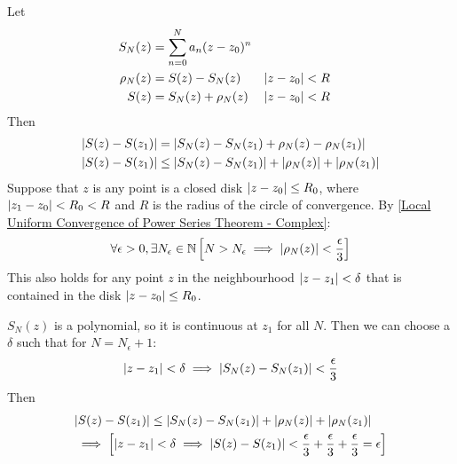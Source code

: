 \documentclass[12pt, english]{book}
\makeatletter
\renewenvironment{proof}[1][\proofname]{\par
	\pushQED{\qed}%
	\normalfont \topsep6\p@\@plus6\p@\relax
	\list{}{%
		\settowidth{\leftmargin}{\itshape\proofname:\hskip\labelsep}%
		\setlength{\labelwidth}{0pt}%
		\setlength{\itemindent}{-\leftmargin}%
	}%
	\item[\hskip\labelsep\itshape#1\@addpunct{:}]\ignorespaces
	}{ \popQED\endlist\@endpefalse}
\makeatother
\begin{document}
	\begin{proof}
		Let 
		\begin{align*}
			S_N(z) &= \sum_{n=0}^{N} a_n(z-z_0)^n \\
			\rho_N(z) &= S(z) - S_N(z) & \abs{z-z_0} &< R \\
			S(z) &= S_N(z) + \rho_N(z) & \abs{z-z_0} &< R
		\end{align*}
		Then 
		\begin{align*}
			\abs{S(z) - S(z_1)} &= \abs{S_N(z) - S_N(z_1) + \rho_N(z) - \rho_N(z_1)} \\
			\abs{S(z) - S(z_1)} &\leq \abs{S_N(z) - S_N(z_1)}+ \abs{\rho_N(z)} + \abs{\rho_N(z_1)}
		\end{align*}
		Suppose that \(z\) is any point is a closed disk \(\abs{z-z_0}\leq R_0\), where \(\abs{z_1 - z_0} < R_0 < R\) and \(R\) is the radius of the circle of convergence. By \cref{Local Uniform Convergence of Power Series Theorem - Complex}:
		\begin{align*}
			\forall \epsilon > 0, \exists N_\epsilon \in \mathbb{N}
			\left[ N > N_\epsilon \implies \abs{\rho_N(z)} < \frac{\epsilon}{3} \right]
		\end{align*}
		This also holds for any point \(z\) in the neighbourhood \(\abs{z-z_1}<\delta\) that is contained in the disk \(\abs{z-z_0}\leq R_0\).
		
		\(S_N(z)\) is a polynomial, so it is continuous at \(z_1\) for all \(N\). Then we can choose a \(\delta\) such that for \(N = N_\epsilon + 1\):
		\begin{align*}
			\abs{z-z_1} < \delta \implies \abs{S_N(z) - S_N(z_1)} < \frac{\epsilon}{3}
		\end{align*}
		Then 
		\begin{align*}
			&\abs{S(z) - S(z_1)} \leq \abs{S_N(z) - S_N(z_1)}+ \abs{\rho_N(z)} + \abs{\rho_N(z_1)} \\
			&\implies \left[ \abs{z-z_1} < \delta \implies \abs{S(z) - S(z_1)} < \frac{\epsilon}{3} + \frac{\epsilon}{3} + \frac{\epsilon}{3} = \epsilon \right]
		\end{align*}
	\end{proof}
\end{document}
